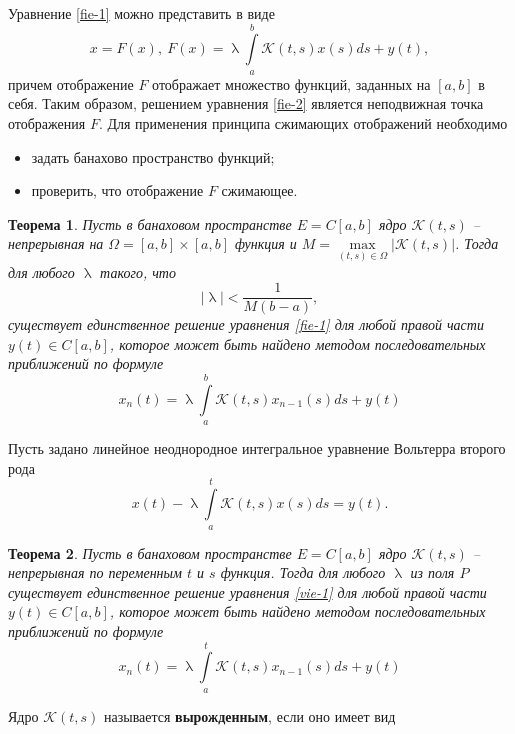 \documentclass[a4paper, 12pt]{report}
\numberwithin{equation}{section}
\renewcommand{\lambda}{\uplambda}
\newtheorem*{theorem}{Теорема}
\begin{document}
	Уравнение \eqref{fie-1} можно представить в виде
	\begin{equation*}
		\label{fie-2}
		x = F(x),\ F(x) = \lambda\int\limits_a^b \mathcal K(t,s)x(s)ds + y(t),
	\end{equation*}
	причем отображение $F$ отображает множество функций, заданных на $[a,b]$ в себя. Таким образом, решением уравнения \eqref{fie-2} является неподвижная точка отображения $F$. Для применения принципа сжимающих отображений необходимо 
	\begin{itemize}
		\item задать банахово пространство функций;
		\item проверить, что отображение $F$ сжимающее.
	\end{itemize}
	\begin{theorem}
		Пусть в банаховом пространстве $E = C[a,b]$ ядро $\mathcal K(t,s)$ -- непрерывная на $\Omega = [a,b]\times [a,b]$ функция и $M = \underset{(t,s)\in \Omega}{\max} |\mathcal K(t,s)|$. Тогда для любого $\lambda$ такого, что 
		\begin{equation*}
			|\lambda| < \dfrac{1}{M(b-a)},
		\end{equation*}
		существует единственное решение уравнения \eqref{fie-1} для любой правой части $y(t) \in C[a,b]$, которое может быть найдено методом последовательных приближений по формуле
		\begin{equation}
			x_n(t) = \lambda\int\limits_a^b \mathcal K(t,s)x_{n-1}(s)ds + y(t)
		\end{equation}
	\end{theorem}
	\noindent
	Пусть задано линейное неоднородное интегральное уравнение Вольтерра второго рода
	\begin{equation}
		\label{vie-1}
		x(t) -\lambda\int\limits_a^t \mathcal K(t,s)x(s)ds = y(t).
	\end{equation}
	\begin{theorem}
		Пусть в банаховом пространстве $E = C[a,b]$ ядро $\mathcal K(t,s)$ -- непрерывная по переменным $t$ и $s$ функция. Тогда для любого $\lambda$ из поля $P$ существует единственное решение уравнения \eqref{vie-1} для любой правой части $y(t) \in C[a,b]$, которое может быть найдено методом последовательных приближений по формуле
		\begin{equation}
			x_n(t) = \lambda\int\limits_a^t \mathcal K(t,s)x_{n-1}(s)ds + y(t)
		\end{equation}
	\end{theorem}
	\noindent
	Ядро $\mathcal K(t,s)$ называется \textbf{вырожденным}, если оно имеет вид
\end{document}
